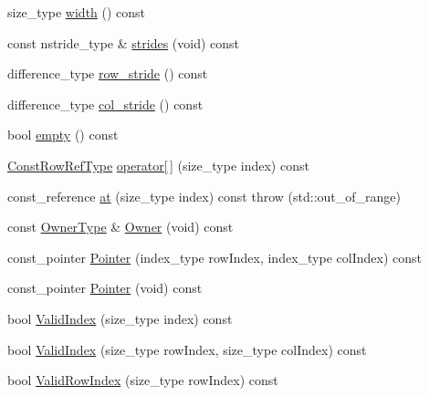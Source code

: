 \begin{DoxyCompactItemize}
\item 
size\+\_\+type \hyperlink{classvct_dynamic_const_matrix_base_ad12c441266a5e5114074114877d762f5}{width} () const 
\item 
const nstride\+\_\+type \& \hyperlink{classvct_dynamic_const_matrix_base_a5796ed8bbf3d2609872a9f710db17e17}{strides} (void) const 
\item 
difference\+\_\+type \hyperlink{classvct_dynamic_const_matrix_base_a59334df55c8726ae084c2f0ae5fef337}{row\+\_\+stride} () const 
\item 
difference\+\_\+type \hyperlink{classvct_dynamic_const_matrix_base_ac0150b5ab06cdfec0c6e0778a2725ab7}{col\+\_\+stride} () const 
\item 
bool \hyperlink{classvct_dynamic_const_matrix_base_ae8170958e8d2b04aaa0285d29a238afb}{empty} () const 
\item 
\hyperlink{classvct_dynamic_const_matrix_base_a42a300cb1afd5f0602ba5c2d7d9cc40b}{Const\+Row\+Ref\+Type} \hyperlink{classvct_dynamic_const_matrix_base_ac6bc039b7cf7b641041365d4824455d7}{operator\mbox{[}$\,$\mbox{]}} (size\+\_\+type index) const 
\item 
const\+\_\+reference \hyperlink{classvct_dynamic_const_matrix_base_af6b16c73de98ab7993e93dbecebbeb55}{at} (size\+\_\+type index) const   throw (std\+::out\+\_\+of\+\_\+range)
\item 
const \hyperlink{classvct_dynamic_const_matrix_base_a2e37ebc2ac741d4346d21f986e625e96}{Owner\+Type} \& \hyperlink{classvct_dynamic_const_matrix_base_aade024ac6cf9570aab8a83af991c4154}{Owner} (void) const 
\item 
const\+\_\+pointer \hyperlink{classvct_dynamic_const_matrix_base_abea6ac985704e38800b3397f648e1657}{Pointer} (index\+\_\+type row\+Index, index\+\_\+type col\+Index) const 
\item 
const\+\_\+pointer \hyperlink{classvct_dynamic_const_matrix_base_ae0be4d2fc6a79184f0342cdc4f849044}{Pointer} (void) const 
\item 
bool \hyperlink{classvct_dynamic_const_matrix_base_a26eaf9feba8311e03c3335b71a6360aa}{Valid\+Index} (size\+\_\+type index) const 
\item 
bool \hyperlink{classvct_dynamic_const_matrix_base_a3658682e2353a3335dea4e8ed9976745}{Valid\+Index} (size\+\_\+type row\+Index, size\+\_\+type col\+Index) const 
\item 
bool \hyperlink{classvct_dynamic_const_matrix_base_a949b4fd96c32c84c9a6710a39a66d8dc}{Valid\+Row\+Index} (size\+\_\+type row\+Index) const 
\item 

\end{DoxyCompactItemize}
